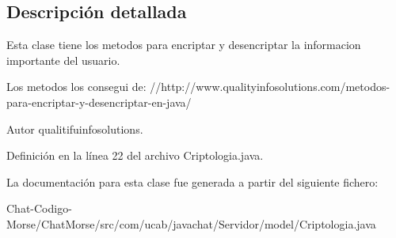 \subsection{Descripción detallada}
Esta clase tiene los metodos para encriptar y desencriptar la informacion importante del usuario.

Los metodos los consegui de\-: //http\-://www.qualityinfosolutions.\-com/metodos-\/para-\/encriptar-\/y-\/desencriptar-\/en-\/java/

\begin{DoxyAuthor}{Autor}
qualitifuinfosolutions. 
\end{DoxyAuthor}


Definición en la línea 22 del archivo Criptologia.\-java.



La documentación para esta clase fue generada a partir del siguiente fichero\-:\begin{DoxyCompactItemize}
\item 
Chat-\/\-Codigo-\/\-Morse/\-Chat\-Morse/src/com/ucab/javachat/\-Servidor/model/Criptologia.\-java\end{DoxyCompactItemize}
